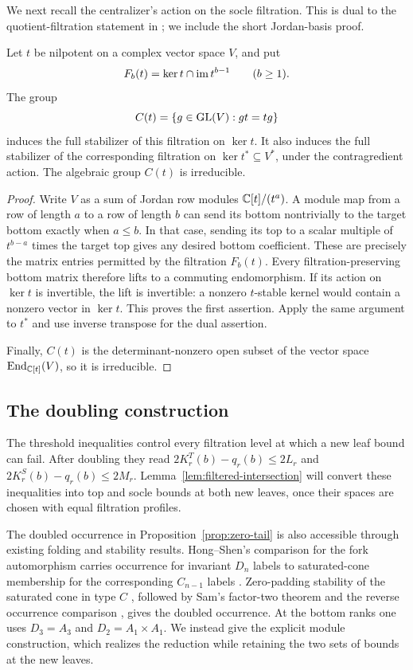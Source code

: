 We next recall the centralizer's action on the socle filtration.
This is dual to the quotient-filtration statement in
\cite[Section~3.6]{Fresse09}; we include the short Jordan-basis proof.

\begin{lemma}\label{tail:centralizer}
Let \(t\) be nilpotent on a complex vector space \(V\), and put
\[
 F_b(t)=\ker t\cap\operatorname{im} t^{b-1}\qquad(b\ge1).
\]
The group
\[
 C(t)=\{g\in\operatorname{GL}(V):gt=tg\}
\]
induces the full stabilizer of this filtration on \(\ker t\).
It also induces the full stabilizer of the corresponding filtration
on \(\ker t^*\subseteq V^*\), under the contragredient action.
The algebraic group \(C(t)\) is irreducible.
\end{lemma}

\begin{proof}
Write \(V\) as a sum of Jordan row modules
\(\mathbb C[t]/(t^a)\).  A module map from a row of length \(a\) to a row of
length \(b\) can send its bottom nontrivially to the target bottom
exactly when \(a\le b\).  In that case, sending its top to a scalar
multiple of \(t^{b-a}\) times the target top gives any desired bottom
coefficient.  These are precisely the matrix entries permitted by
the filtration \(F_b(t)\).  Every filtration-preserving bottom matrix
therefore lifts to a commuting endomorphism.  If its action on
\(\ker t\) is invertible, the lift is invertible: a nonzero
\(t\)-stable kernel would contain a nonzero vector in \(\ker t\).
This proves the first assertion.  Apply the same argument to \(t^*\)
and use inverse transpose for the dual assertion.

Finally, \(C(t)\) is the determinant-nonzero open subset of the vector
space \(\operatorname{End}_{\mathbb C[t]}(V)\), so it is irreducible.
\end{proof}

\subsection{The doubling construction}

The threshold inequalities control every filtration level at which
a new leaf bound can fail. After doubling they read
\(2K_r^T(b)-q_r(b)\le2L_r\) and
\(2K_r^S(b)-q_r(b)\le2M_r\).
Lemma~\ref{lem:filtered-intersection} will convert these inequalities
into top and socle bounds at both new leaves, once their spaces are
chosen with equal filtration profiles.

The doubled occurrence in Proposition~\ref{prop:zero-tail} is also
accessible through existing folding and stability results.
Hong--Shen's comparison for the fork automorphism carries occurrence
for invariant $D_n$ labels to saturated-cone membership for the
corresponding $C_{n-1}$ labels
\cite[Proposition~1.4(3)]{HS15}. Zero-padding stability of the
saturated cone in type $C$
\cite[Theorem~1.1]{GORY22}, followed by Sam's factor-two theorem
\cite[Theorem~1.1]{Sam12} and the reverse occurrence comparison
\cite[Proposition~1.4(1)]{HS15}, gives the doubled occurrence.
At the bottom ranks one uses $D_3=A_3$ and
$D_2=A_1\times A_1$. We instead give the explicit module construction,
which realizes the reduction while retaining the two sets of bounds
at the new leaves.

